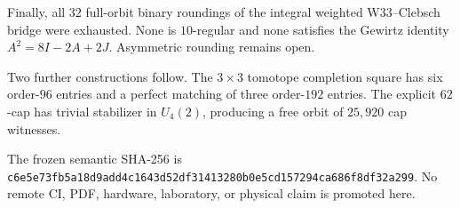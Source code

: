 Finally, all $32$ full-orbit binary roundings of the integral weighted
W33--Clebsch bridge were exhausted.  None is $10$-regular and none satisfies the
Gewirtz identity $A^2=8I-2A+2J$.  Asymmetric rounding remains open.

Two further constructions follow.  The $3\times3$ tomotope completion square
has six order-$96$ entries and a perfect matching of three order-$192$ entries.
The explicit $62$-cap has trivial stabilizer in $U_4(2)$, producing a free orbit
of $25{,}920$ cap witnesses.

The frozen semantic SHA-256 is
\texttt{c6e5e73fb5a18d9add4c1643d52df31413280b0e5cd157294ca686f8df32a299}.
No remote CI, PDF, hardware, laboratory, or physical claim is promoted here.
